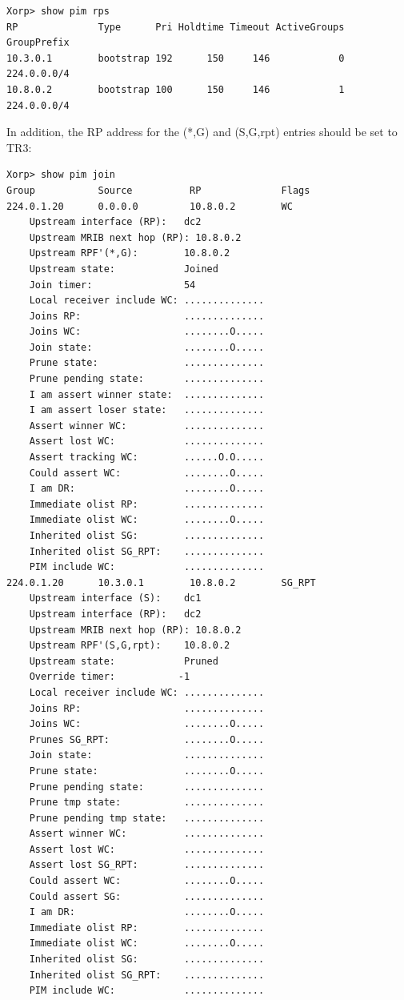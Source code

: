 \documentclass[11pt]{report}
\begin{document}
\begin{itemize}
\begin{verbatim}
Xorp> show pim rps 
RP              Type      Pri Holdtime Timeout ActiveGroups GroupPrefix       
10.3.0.1        bootstrap 192      150     146            0 224.0.0.0/4       
10.8.0.2        bootstrap 100      150     146            1 224.0.0.0/4       
\end{verbatim}

  In addition, the RP address for the (*,G) and (S,G,rpt) entries should be
  set to TR3:

\begin{verbatim}
Xorp> show pim join 
Group           Source          RP              Flags
224.0.1.20      0.0.0.0         10.8.0.2        WC   
    Upstream interface (RP):   dc2
    Upstream MRIB next hop (RP): 10.8.0.2
    Upstream RPF'(*,G):        10.8.0.2
    Upstream state:            Joined 
    Join timer:                54
    Local receiver include WC: ..............
    Joins RP:                  ..............
    Joins WC:                  ........O.....
    Join state:                ........O.....
    Prune state:               ..............
    Prune pending state:       ..............
    I am assert winner state:  ..............
    I am assert loser state:   ..............
    Assert winner WC:          ..............
    Assert lost WC:            ..............
    Assert tracking WC:        ......O.O.....
    Could assert WC:           ........O.....
    I am DR:                   ........O.....
    Immediate olist RP:        ..............
    Immediate olist WC:        ........O.....
    Inherited olist SG:        ..............
    Inherited olist SG_RPT:    ..............
    PIM include WC:            ..............
224.0.1.20      10.3.0.1        10.8.0.2        SG_RPT 
    Upstream interface (S):    dc1
    Upstream interface (RP):   dc2
    Upstream MRIB next hop (RP): 10.8.0.2
    Upstream RPF'(S,G,rpt):    10.8.0.2
    Upstream state:            Pruned 
    Override timer:           -1
    Local receiver include WC: ..............
    Joins RP:                  ..............
    Joins WC:                  ........O.....
    Prunes SG_RPT:             ........O.....
    Join state:                ..............
    Prune state:               ........O.....
    Prune pending state:       ..............
    Prune tmp state:           ..............
    Prune pending tmp state:   ..............
    Assert winner WC:          ..............
    Assert lost WC:            ..............
    Assert lost SG_RPT:        ..............
    Could assert WC:           ........O.....
    Could assert SG:           ..............
    I am DR:                   ........O.....
    Immediate olist RP:        ..............
    Immediate olist WC:        ........O.....
    Inherited olist SG:        ..............
    Inherited olist SG_RPT:    ..............
    PIM include WC:            ..............
\end{verbatim}


\end{itemize}
\end{document}
